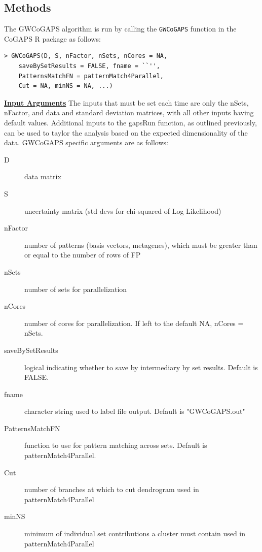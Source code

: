 \documentclass{report}
\begin{document}
\subsection{Methods}
\par The GWCoGAPS algorithm is run by calling the \texttt{GWCoGAPS} function in the CoGAPS R package as follows:

\begin{verbatim}
> GWCoGAPS(D, S, nFactor, nSets, nCores = NA,
    saveBySetResults = FALSE, fname = ``'',
    PatternsMatchFN = patternMatch4Parallel,
    Cut = NA, minNS = NA, ...)
\end{verbatim}

\par \noindent \textbf{\underline{Input Arguments}}
The inputs that must be set each time are only the nSets, nFactor, and data and standard deviation matrices, with all other inputs having default values. Additional inputs to the gapsRun function, as outlined previously, can be used to taylor the analysis based on the expected dimensionality of the data. GWCoGAPS specific arguments are as follows:

\begin{description}
\item[D]{data matrix}
\item[S]{uncertainty matrix (std devs for chi-squared of Log Likelihood)}
\item[nFactor]{number of patterns (basis vectors, metagenes), which must be
greater than or equal to the number of rows of FP}
\item[nSets]{number of sets for parallelization}
\item[nCores]{number of cores for parallelization. If left to the default NA, nCores = nSets. }
\item[saveBySetResults]{logical indicating whether to save by intermediary by set results. Default is FALSE.}
\item[fname]{character string used to label file output. Default is "GWCoGAPS.out"}
\item[PatternsMatchFN]{function to use for pattern matching across sets. Default is patternMatch4Parallel.}
\item[Cut]{number of branches at which to cut dendrogram used in patternMatch4Parallel}
\item[minNS]{minimum of individual set contributions a cluster must contain used in patternMatch4Parallel}
\end{description}
\end{document}
